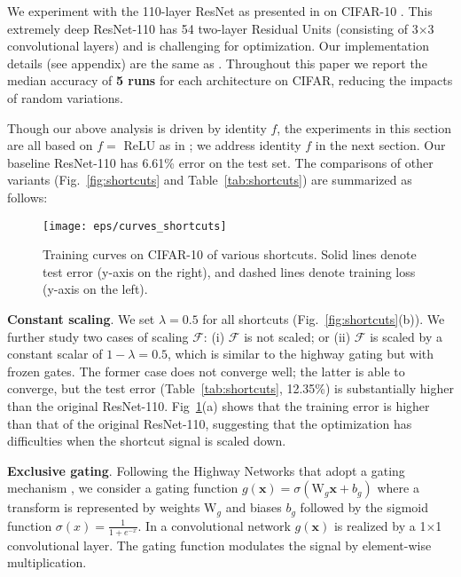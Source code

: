 \documentclass[runningheads]{llncs}
\newcommand{\ve}[1]{\mathbf{#1}} \newcommand{\ma}[1]{\mathrm{#1}}
\begin{document}
We experiment with the 110-layer ResNet as presented in \cite{He2016} on CIFAR-10 \cite{Krizhevsky2009}. This extremely deep ResNet-110 has 54 two-layer Residual Units (consisting of 3$\times$3 convolutional layers) and is challenging for optimization.
Our implementation details (see appendix) are the same as \cite{He2016}. Throughout this paper we report the median accuracy of \textbf{5 runs} for each architecture on CIFAR, reducing the impacts of random variations.

Though our above analysis is driven by identity $f$, the experiments in this section are all based on $f=$ ReLU as in \cite{He2016}; we address identity $f$ in the next section.
Our baseline ResNet-110 has 6.61\% error on the test set.
The comparisons of other variants (Fig.~\ref{fig:shortcuts} and Table~\ref{tab:shortcuts}) are summarized as follows:

\begin{figure}[t]
\centering
\texttt{[image: eps/curves\_shortcuts]}
\caption{Training curves on CIFAR-10 of various shortcuts. Solid lines denote test error (y-axis on the right), and dashed lines denote training loss (y-axis on the left).
}
\label{fig:curves_shortcuts}
\end{figure}

\textbf{Constant scaling}. We set $\lambda=0.5$ for all shortcuts (Fig.~\ref{fig:shortcuts}(b)). We further study two cases of scaling $\mathcal{F}$: (i) $\mathcal{F}$ is not scaled; or (ii) $\mathcal{F}$ is scaled by a constant scalar of $1-\lambda=0.5$, which is similar to the highway gating \cite{Srivastava2015,Srivastava2015a} but with frozen gates. The former case does not converge well; the latter is able to converge, but the test error (Table~\ref{tab:shortcuts}, 12.35\%) is substantially higher than the original ResNet-110. Fig~\ref{fig:curves_shortcuts}(a) shows that the training error is higher than that of the original ResNet-110, suggesting that the optimization has difficulties when the shortcut signal is scaled down.

\textbf{Exclusive gating}. Following the Highway Networks \cite{Srivastava2015,Srivastava2015a} that adopt a gating mechanism \cite{Hochreiter1997},
we consider a gating function $g(\ve{x})=\sigma(\ma{W}_g\ve{x}+b_g)$ where a transform is represented by weights $\ma{W}_g$ and biases $b_g$ followed by the sigmoid function $\sigma(x)=\frac{1}{1+e^{-x}}$. In a convolutional network $g(\ve{x})$ is realized by a 1$\times$1 convolutional layer. The gating function modulates the signal by element-wise multiplication.
\end{document}
